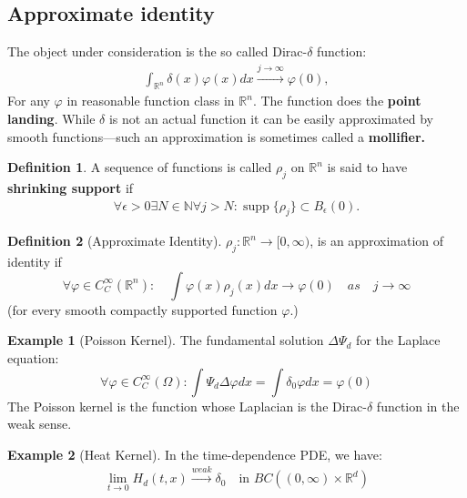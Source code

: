 \documentclass[a4paper,11pt,fleqn]{book}
\theoremstyle{definition}
\newtheorem{definition}{Definition}[section]
\newtheorem*{example}{Example}
\theoremstyle{remark}
\DeclareMathOperator*{\support}{supp}
\begin{document}
\subsection{Approximate identity}
The object under consideration is the so called Dirac-$\delta$ function:
\begin{align*}
	\int_{\mathbb{R}^n} \delta(x) \varphi(x) dx \overset{j \rightarrow \infty}{\longrightarrow} \varphi(0),
\end{align*}
For any $\varphi$ in reasonable function class in $\mathbb{R}^n$. The function does the \textbf{point landing}. While $\delta$ is not an actual function it can be easily approximated by smooth functions---such an approximation is sometimes called a \textbf{mollifier.}

\begin{definition}
	A sequence of functions is called $\rho_j$ on $\mathbb{R}^n$ is said to have \textbf{shrinking support} if 
	\begin{align*}
		\forall \epsilon > 0 \exists N \in \mathbb{N} \forall j > N: \support\{\rho_j\} \subset B_\epsilon(0). 
	\end{align*}
\end{definition}

\begin{definition}[Approximate Identity]
$\rho_j: \mathbb{R}^n \rightarrow [0, \infty)$, is an approximation of identity if
	\begin{equation}
	 	\forall \varphi \in C^\infty_C(\mathbb{R}^n):\quad	\int \varphi(x) \rho_j(x) dx \rightarrow \varphi(0) \quad as \quad j \rightarrow \infty 
	\end{equation}
	(for every smooth compactly supported function $\varphi$.) 
\end{definition}


\begin{example}[Poisson Kernel]
The fundamental solution $\Delta \Psi_d$ for the Laplace equation:
\begin{equation*}
	\forall \varphi \in C^\infty_C(\Omega):  \int \Psi_d \Delta \varphi dx = \int \delta_0 \varphi dx = \varphi(0)
\end{equation*} 	
The Poisson kernel is the function whose Laplacian is the Dirac-$\delta$ function in the weak sense.
\end{example}

\begin{example}[Heat Kernel]
	In the time-dependence PDE, we have:
	\begin{align*}
		\lim_{t \rightarrow 0} H_d(t, x) \overset{weak}{\rightarrow} \delta_0 \quad \text{in } BC((0, \infty) \times \mathbb{R}^d)
	\end{align*}
\end{example}
\end{document}
